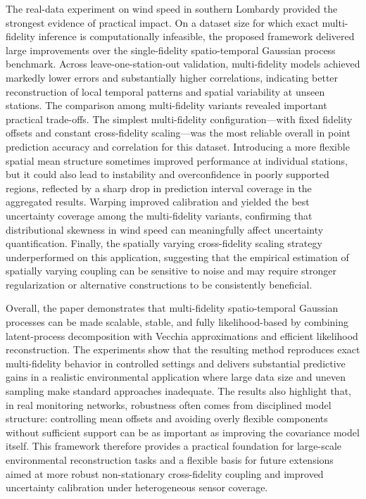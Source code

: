 \documentclass[12pt]{article}
\begin{document}
The real-data experiment on wind speed in southern Lombardy provided the strongest evidence of practical impact. On a dataset size for which exact multi-fidelity inference is computationally infeasible, the proposed framework delivered large improvements over the single-fidelity spatio-temporal Gaussian process benchmark. Across leave-one-station-out validation, multi-fidelity models achieved markedly lower errors and substantially higher correlations, indicating better reconstruction of local temporal patterns and spatial variability at unseen stations. The comparison among multi-fidelity variants revealed important practical trade-offs. The simplest multi-fidelity configuration—with fixed fidelity offsets and constant cross-fidelity scaling—was the most reliable overall in point prediction accuracy and correlation for this dataset. Introducing a more flexible spatial mean structure sometimes improved performance at individual stations, but it could also lead to instability and overconfidence in poorly supported regions, reflected by a sharp drop in prediction interval coverage in the aggregated results. Warping improved calibration and yielded the best uncertainty coverage among the multi-fidelity variants, confirming that distributional skewness in wind speed can meaningfully affect uncertainty quantification. Finally, the spatially varying cross-fidelity scaling strategy underperformed on this application, suggesting that the empirical estimation of spatially varying coupling can be sensitive to noise and may require stronger regularization or alternative constructions to be consistently beneficial.

Overall, the paper demonstrates that multi-fidelity spatio-temporal Gaussian processes can be made scalable, stable, and fully likelihood-based by combining latent-process decomposition with Vecchia approximations and efficient likelihood reconstruction. The experiments show that the resulting method reproduces exact multi-fidelity behavior in controlled settings and delivers substantial predictive gains in a realistic environmental application where large data size and uneven sampling make standard approaches inadequate. The results also highlight that, in real monitoring networks, robustness often comes from disciplined model structure: controlling mean offsets and avoiding overly flexible components without sufficient support can be as important as improving the covariance model itself. This framework therefore provides a practical foundation for large-scale environmental reconstruction tasks and a flexible basis for future extensions aimed at more robust non-stationary cross-fidelity coupling and improved uncertainty calibration under heterogeneous sensor coverage.
\end{document}
